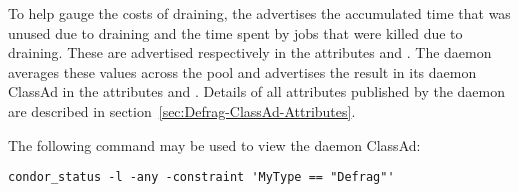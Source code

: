 To help gauge the costs of draining, the  advertises
the accumulated time that was unused due to draining and the time
spent by jobs that were killed due to draining.  
These are advertised
respectively in the attributes  and
.  
The  daemon
averages these values across the pool and advertises the result in its
daemon ClassAd in the attributes  and
.  
Details of all attributes published by
the  daemon are described in
section~\ref{sec:Defrag-ClassAd-Attributes}.

The following command may be used to view the  daemon
ClassAd:

\begin{verbatim}
condor_status -l -any -constraint 'MyType == "Defrag"'
\end{verbatim}

